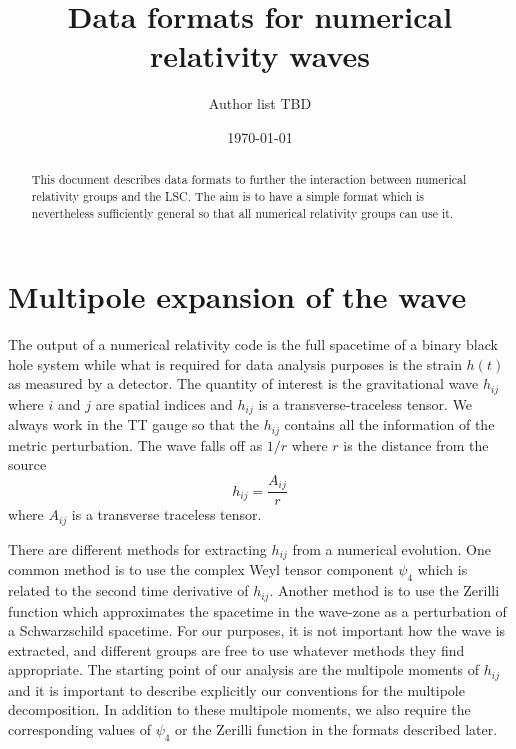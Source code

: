\documentclass[amsmath,amssymb]{article}
\begin{document}
\title{Data formats for numerical relativity waves}
\date{\today}
\author{Author list TBD}
\maketitle

\begin{abstract}
This document describes data formats to further the interaction
between numerical relativity groups and the LSC. The aim is to have a
simple format which is nevertheless sufficiently general so that all
numerical relativity groups can use it.  
\end{abstract}

\section{Multipole expansion of the wave}
\label{sec:multipoles}

The output of a numerical relativity code is the full spacetime of a
binary black hole system while what is required for data analysis
purposes is the strain $h(t)$ as measured by a detector.  The quantity
of interest is the gravitational wave $h_{ij}$ where $i$ and $j$ are
spatial indices and $h_{ij}$ is a transverse-traceless tensor.  We
always work in the TT gauge so that the $h_{ij}$ contains all the
information of the metric perturbation.  The wave falls off as $1/r$
where $r$ is the distance from the source
\begin{equation}
  \label{eq:1}
  h_{ij} = \frac{A_{ij}}{r} 
\end{equation}
where $A_{ij}$ is a transverse traceless tensor.  

There are different methods for extracting $h_{ij}$ from a numerical
evolution.  One common method is to use the complex Weyl tensor
component $\psi_4$ which is related to the second time derivative of
$h_{ij}$. Another method is to use the Zerilli function which
approximates the spacetime in the wave-zone as a perturbation of a
Schwarzschild spacetime.  For our purposes, it is not important how
the wave is extracted, and different groups are free to use whatever
methods they find appropriate.  The starting point of our analysis are
the multipole moments of $h_{ij}$ and it is important to describe
explicitly our conventions for the multipole decomposition.  In
addition to these multipole moments, we also require the corresponding
values of $\psi_4$ or the Zerilli function in the formats described
later. 
\end{document}
